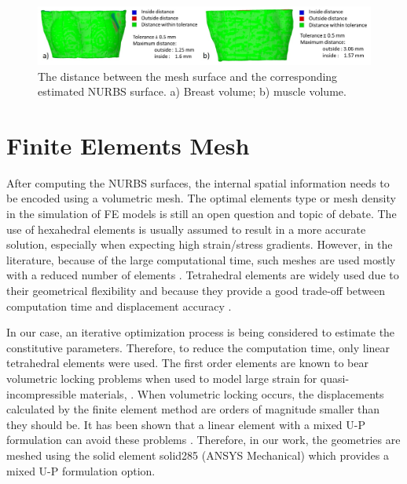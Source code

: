 \begin{figure}[!h]
\centering
\includegraphics[width=\textwidth,keepaspectratio]{figures/nurbsVSsurfaceMeshError.jpg} 
\caption{The distance between the mesh surface and the corresponding estimated NURBS surface. a) Breast volume; b) muscle volume.} \label{fig:nurbsVSsurfaceMeshError}
\end{figure}


\section{ Finite Elements Mesh}\label{section:myFEM}

After computing the NURBS surfaces, the internal spatial information needs to be encoded using a volumetric mesh. The optimal elements type or mesh density in the simulation of FE models is still an open question and topic of debate. The use of hexahedral elements is usually assumed to result in a more accurate solution, especially when expecting high strain/stress gradients. However, in the literature, because of the large computational time, such meshes are used mostly with a reduced number of elements \citep{ruiter_model_based_2006,gamage_modelling_2012}. Tetrahedral elements are widely used due to their geometrical flexibility and because they provide a good trade-off between computation time and displacement accuracy \citep{han_nonlinear_2014,palomar_finite_2008,griesenauer_breast_2017}.   

In our case, an iterative optimization process is being considered to estimate the constitutive parameters. Therefore, to reduce the computation time, only linear tetrahedral elements were used. The first order elements are known to bear volumetric locking problems when used to model large strain for quasi-incompressible materials, \citep{fung_classical_2017}. When volumetric locking occurs, the displacements calculated by the finite element method are orders of magnitude smaller than they should be. It has been shown that a linear element with a mixed U-P formulation can avoid these problems \citep{rohan_finite_2014}. Therefore, in our work, the geometries are meshed using the solid element solid285 (ANSYS Mechanical) which provides a mixed U-P formulation option. 

